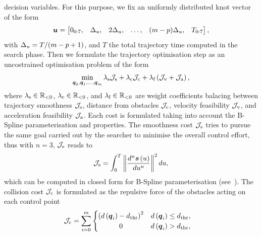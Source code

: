 decision variables. For this purpose, we fix an uniformly distributed knot vector of the form
\begin{equation*}
	\boldsymbol{u} =
	\begin{bmatrix}
		0_{0:7}, & \Delta_{u}, & 2\Delta_{u}, & \dots, & (m-p)\Delta_{u}, & T_{0:7}
	\end{bmatrix},
\end{equation*}
with $\Delta_{u} = T/(m - p + 1)$, and $T$ the total trajectory time computed in the search phase.
Then we formulate the trajectory optimisation step as an uncostrained optimisation problem of the form
\begin{equation}
	\label{EQ:PLANNING-OPTIMISATION}
	\min_{\boldsymbol{q}_0, \boldsymbol{q}_1, \dots, \boldsymbol{q}_{m}} \lambda_{\text{s}} \mathcal{J}_{\text{s}} + 
	\lambda_{\text{c}} \mathcal{J}_{\text{c}} + \lambda_{\text{f}} \left( \mathcal{J}_{\text{v}} + \mathcal{J}_{\text{a}} \right),
\end{equation}
where $\lambda_{\text{s}} \in \mathbb{R}_{<0}$, $\lambda_{\text{c}} \in \mathbb{R}_{<0}$, and $\lambda_{\text{f}} \in \mathbb{R}_{<0}$ are
weight coefficients balacing between trajectory smoothness $\mathcal{J}_{\text{s}}$, distance from obstacles $\mathcal{J}_{\text{c}}$,
velocity feasibility $\mathcal{J}_{\text{v}}$, and acceleration feasibility $\mathcal{J}_{\text{a}}$.
Each cost is formulated taking into account the B-Spline parameterisation and properties.
The smoothness cost $\mathcal{J}_{\text{s}}$ tries to pursue the same goal carried out by the searcher to minimise the overall control
effort, thus with $n = 3$, $\mathcal{J}_{\text{s}}$ reads to
\begin{equation*}
	\mathcal{J}_{\text{s}} = \int_0^{T} \left \lVert {\frac{d^n \boldsymbol{s} \left(u\right)}{d u^n}} \right \rVert^2 d u,
\end{equation*}
which can be computed in closed form for B-Spline parameterisation (see~).
The collision cost $\mathcal{J}_{\text{c}}$ is formulated as the repulsive force of the obstacles acting on each control point
\begin{equation*}
	\mathcal{J}_{\text{c}} = \sum_{i = 0}^{m}
	\begin{cases}
		\begin{matrix}
			\left( d \left( \boldsymbol{q}_i \right) - d_{\text{thr}} \right)^2 & d \left( \boldsymbol{q}_i \right) \le d_{\text{thr}}, \\
			0 & d \left( \boldsymbol{q}_i \right) > d_{\text{thr}},
		\end{matrix}
	\end{cases}
\end{equation*}
